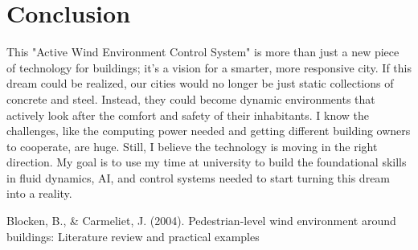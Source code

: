 \documentclass{article}
\begin{document}
\section{Conclusion}
This "Active Wind Environment Control System" is more than just a new piece of technology for buildings; it's a vision for a smarter, more responsive city. If this dream could be realized, our cities would no longer be just static collections of concrete and steel. Instead, they could become dynamic environments that actively look after the comfort and safety of their inhabitants. I know the challenges, like the computing power needed and getting different building owners to cooperate, are huge. Still, I believe the technology is moving in the right direction. My goal is to use my time at university to build the foundational skills in fluid dynamics, AI, and control systems needed to start turning this dream into a reality.
\begin{thebibliography}{9}
Blocken, B., & Carmeliet, J. (2004). Pedestrian-level wind environment around buildings: Literature review and practical examples
\end{thebibliography}
\end{document}
